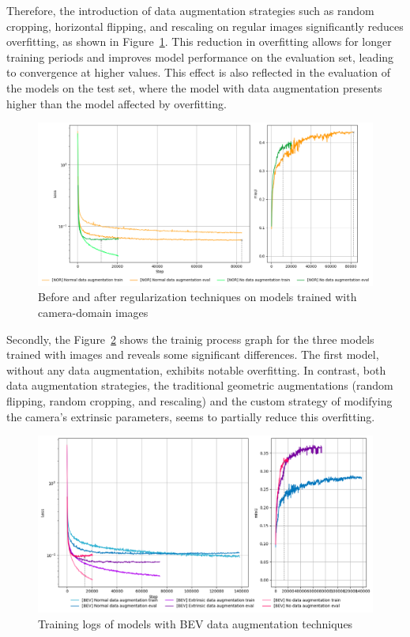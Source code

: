 Therefore, the introduction of data augmentation strategies such as random cropping, horizontal flipping, and rescaling on regular images significantly reduces overfitting, as shown in Figure~\ref{fig:normal_before_after_data_aug_logs}. This reduction in overfitting allows for longer training periods and improves model performance on the evaluation set, leading to convergence at higher  values. This effect is also reflected in the evaluation of the models on the test set, where the model with data augmentation presents higher  than the model affected by overfitting.

\begin{figure}[h!]
    \centering
    \includegraphics[width=0.7\linewidth]{./images/experiments/nor_before_after_data_aug_logs.png}
    \caption{Before and after regularization techniques on models trained with camera-domain images}
    \label{fig:normal_before_after_data_aug_logs}
\end{figure}

Secondly, the Figure~\ref{fig:bev_before_after_data_aug_logs} shows the trainig process graph for the three models trained with  images and reveals some significant differences. The first model, without any data augmentation, exhibits notable overfitting. In contrast, both data augmentation strategies, the traditional geometric augmentations (random flipping, random cropping, and rescaling) and the custom strategy of modifying the camera's extrinsic parameters, seems to partially reduce this overfitting.

\begin{figure}[h!]
    \centering
    \includegraphics[width=0.7\linewidth]{./images/experiments/bev_before_after_data_aug_logs.png}
    \caption{Training logs of models with BEV data augmentation techniques}
    \label{fig:bev_before_after_data_aug_logs}
\end{figure}

